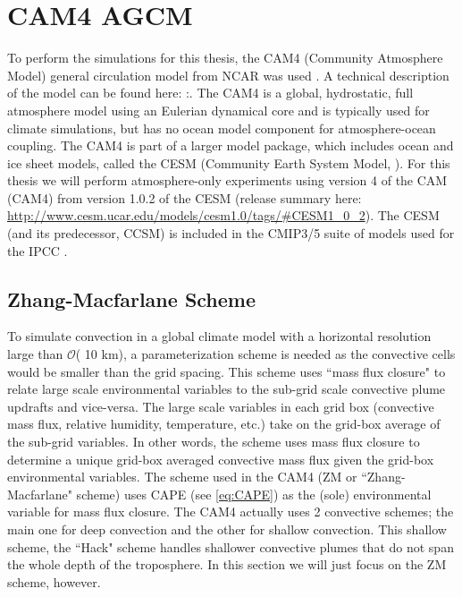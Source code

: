\documentclass[letterpaper,12pt,titlepage,oneside,final]{book}
\begin{document}
\section{CAM4 AGCM}\label{cam4}
To perform the simulations for this thesis, the CAM4 (Community Atmosphere Model) general circulation model from NCAR was used \citep{neale_mean_2013}. A technical description of the model can be found here: \citep{neale_description_2010}:. The CAM4 is a global, hydrostatic, full atmosphere model using an Eulerian dynamical core and is typically used for climate simulations, but has no ocean model component for atmosphere-ocean coupling. The CAM4 is part of a larger model package, which includes ocean and ice sheet models, called the CESM (Community Earth System Model, \cite{kay_community_2014}). For this thesis we will perform atmosphere-only experiments using version 4 of the CAM (CAM4) from version 1.0.2 of the CESM (release summary here: \url{http://www.cesm.ucar.edu/models/cesm1.0/tags/#CESM1_0_2}). The CESM (and its predecessor, CCSM) is included in the CMIP3/5 suite of models used for the IPCC \citep{taylor_overview_2011}.

\subsection{Zhang-Macfarlane Scheme}\label{ZM}
To simulate convection in a global climate model with a horizontal resolution large than $\mathcal{O}$( 10 km), a parameterization scheme is needed as the convective cells would be smaller than the grid spacing. This scheme uses ``mass flux closure" to relate large scale environmental variables to the sub-grid scale convective plume updrafts and vice-versa. The large scale variables in each grid box (convective mass flux, relative humidity, temperature, etc.) take on the grid-box average of the sub-grid variables. In other words, the scheme uses mass flux closure to determine a unique grid-box averaged convective mass flux given the grid-box environmental variables. The scheme used in the CAM4 (ZM or ``Zhang-Macfarlane" scheme) \citep{zhang_sensitivity_1995} uses CAPE (see \ref{eq:CAPE}) as the (sole) environmental variable for mass flux closure. The CAM4 actually uses 2 convective schemes; the main one for deep convection and the other for shallow convection. This shallow scheme, the ``Hack" scheme \citep{hack_parameterization_1994} handles shallower convective plumes that do not span the whole depth of the troposphere. In this section we will just focus on the ZM scheme, however.
\end{document}
